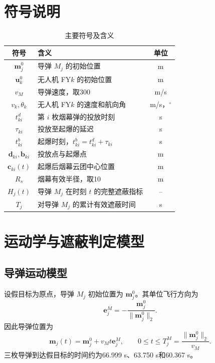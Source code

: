 \documentclass[12pt,a4paper]{ctexart}
\begin{document}
\section{符号说明}

\begin{table}[H]
\centering
\caption{主要符号及含义}
\begin{tabularx}{0.94\textwidth}{cXc}
\toprule
符号 & 含义 & 单位\\
\midrule
$\bm m_j^0$ & 导弹 $M_j$ 的初始位置 & m\\
$\bm u_k^0$ & 无人机 FY$k$ 的初始位置 & m\\
$v_M$ & 导弹速度，取300 & m/s\\
$v_k,\theta_k$ & 无人机 FY$k$ 的速度和航向角 & m/s，$^\circ$\\
$t_{ki}^{d}$ & 第 $i$ 枚烟幕弹的投放时刻 & s\\
$\tau_{ki}$ & 投放至起爆的延迟 & s\\
$t_{ki}^{b}$ & 起爆时刻，$t_{ki}^{b}=t_{ki}^{d}+\tau_{ki}$ & s\\
$\bm d_{ki},\bm b_{ki}$ & 投放点与起爆点 & m\\
$\bm c_{ki}(t)$ & 起爆后烟幕云团中心位置 & m\\
$R_s$ & 烟幕有效半径，取10 & m\\
$H_j(t)$ & 导弹 $M_j$ 在时刻 $t$ 的完整遮蔽指标 & --\\
$T_j$ & 对导弹 $M_j$ 的累计有效遮蔽时间 & s\\
\bottomrule
\end{tabularx}
\end{table}

\section{运动学与遮蔽判定模型}

\subsection{导弹运动模型}

设假目标为原点，导弹 $M_j$ 初始位置为 $\bm m_j^0$。其单位飞行方向为
\begin{equation}
\bm e_j^M=-\frac{\bm m_j^0}{\|\bm m_j^0\|_2}.
\end{equation}
因此导弹位置为
\begin{equation}
\bm m_j(t)=\bm m_j^0+v_Mt\bm e_j^M,\qquad
0\le t\le T_j^M=\frac{\|\bm m_j^0\|_2}{v_M}.
\end{equation}
三枚导弹到达假目标的时间约为66.999 s、63.750 s和60.367 s。
\end{document}
